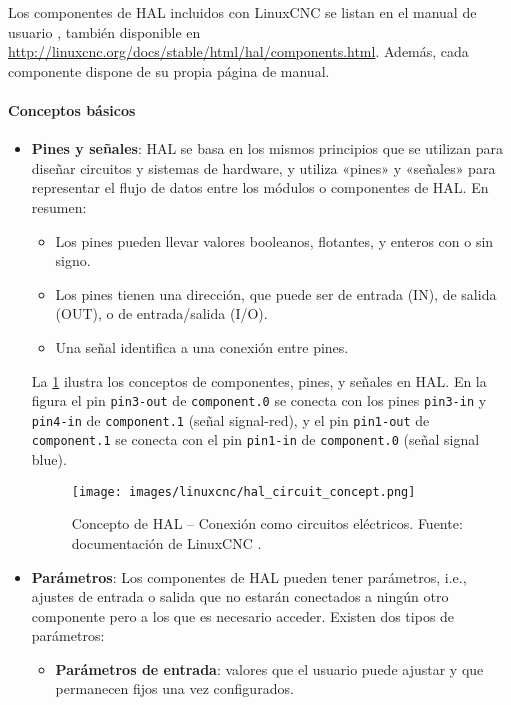 \documentclass[english,spanish,a4paper,11pt]{article}
\begin{document}
Los componentes de \ac{HAL} incluidos con LinuxCNC se listan en el manual de usuario \cite{linuxcncdoc}, también disponible en \url{http://linuxcnc.org/docs/stable/html/hal/components.html}. Además, cada componente dispone de su propia página de manual.


\paragraph{Conceptos básicos}\hfill\medskip

\begin{itemize}
    \item \textbf{Pines y señales}: \ac{HAL} se basa en los mismos principios que se utilizan para diseñar circuitos y sistemas de hardware, y utiliza «pines» y «señales» para representar el flujo de datos entre los módulos o componentes de \ac{HAL}. En resumen:
    \begin{itemize}
        \item Los pines pueden llevar valores booleanos, flotantes, y enteros con o sin signo.
        \item Los pines tienen una dirección, que puede ser de entrada (IN), de salida (OUT), o de entrada/salida (I/O).
        \item Una señal identifica a una conexión entre pines.
    \end{itemize}

    La \cref{fig:hal_circuit_concept} ilustra los conceptos de componentes, pines, y señales en \ac{HAL}. En la figura el pin \texttt{pin3-out} de \texttt{component.0} se conecta con los pines \texttt{pin3-in} y \texttt{pin4-in} de \texttt{component.1} (señal signal-red), y el pin \texttt{pin1-out} de \texttt{component.1} se conecta con el pin \texttt{pin1-in} de \texttt{component.0} (señal signal blue).

    \begin{figure}[!ht]
        \centering
        \texttt{[image: images/linuxcnc/hal\_circuit\_concept.png]}
        \caption{Concepto de HAL -- Conexión como circuitos eléctricos. Fuente: documentación de LinuxCNC \cite{linuxcncdoc}.}
        \label{fig:hal_circuit_concept}
    \end{figure}


    \item \textbf{Parámetros}: Los componentes de \ac{HAL} pueden tener parámetros, i.e., ajustes de entrada o salida que no estarán conectados a ningún otro componente pero a los que es necesario acceder. Existen dos tipos de parámetros: 
    \begin{itemize}
        \item \textbf{Parámetros de entrada}: valores que el usuario puede ajustar y que permanecen fijos una vez configurados.


\end{itemize}
\end{itemize}
\end{document}
